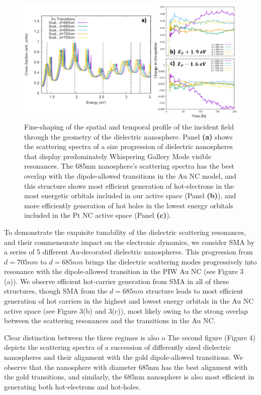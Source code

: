 \documentclass[journal=jpclcd,manuscript=letter]{achemso}
\begin{document}
\begin{figure}
\begin{center}
\includegraphics[width=6in]{figs/Au_WGM_Spectrum_and_Trajectories.png}
\caption{Fine-shaping of the spatial and temporal profile of the incident field
through the geometry of the dielectric nanosphere.  Panel {\bf (a)} shows
the scattering spectra of a size progression of dielectric nanospheres that display
predominately Whispering Gallery Mode visible resonances.  The
685nm nanosphere's scattering spectra has the best overlap with the dipole-allowed
transitions in the Au NC model, and this structure shows most efficient
generation of hot-electrons in the most energetic orbitals included in our
active space (Panel {\bf (b)}), and more efficiently generation of
hot holes in the lowest energy orbitals included in the Pt NC active space (Panel
{\bf (c)}).   }
\end{center}
\end{figure}
To demonstrate the exquisite tunability of the dielectric scattering resonances, and their 
commensurate impact on the electronic dynamics, we consider SMA by a series of 5 different Au-decorated dielectric
nanospheres.  This progression from $d=705 nm$ to $d=685 nm$ brings the dielectric scattering modes progressively 
into resonance with the dipole-allowed transition in the PIW Au NC (see Figure 3 (a)).  We observe efficient hot-carrier
generation from SMA in all of these structures, though SMA from the $d=685 nm$ structure leads to most efficient generation
of hot carriers in the highest and lowest energy orbitals in the Au NC active space (see Figure 3(b) and 3(c)), 
most likely owing to the strong overlap between the scattering resonances and the transitions in the Au NC.

Clear distinction between the three regimes is also o
The second figure (Figure 4) depicts the scattering spectra of a succession of differently sized dielectric nanospheres
and their alignment with the gold dipole-allowed transitions. We observe that the nanosphere with diameter 685nm
has the best alignment with the gold transitions, and similarly, the 685nm nanosphere is also most efficient
in generating both hot-electrons and hot-holes. 
\end{document}
